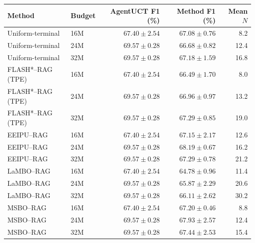 \begin{tabular}{@{}llrrr@{}}
\toprule
Method & Budget & AgentUCT F1 (\%) & Method F1 (\%) & Mean $N$\\
\midrule
Uniform-terminal & 16M & $67.40\pm2.54$ & $67.08\pm0.76$ & 8.2\\
Uniform-terminal & 24M & $69.57\pm0.28$ & $66.68\pm0.82$ & 12.4\\
Uniform-terminal & 32M & $69.57\pm0.28$ & $67.18\pm1.59$ & 16.8\\
FLASH*--RAG (TPE) & 16M & $67.40\pm2.54$ & $66.49\pm1.70$ & 8.0\\
FLASH*--RAG (TPE) & 24M & $69.57\pm0.28$ & $66.96\pm0.97$ & 13.2\\
FLASH*--RAG (TPE) & 32M & $69.57\pm0.28$ & $67.29\pm0.85$ & 19.0\\
EEIPU--RAG & 16M & $67.40\pm2.54$ & $67.15\pm2.17$ & 12.6\\
EEIPU--RAG & 24M & $69.57\pm0.28$ & $68.19\pm0.67$ & 16.2\\
EEIPU--RAG & 32M & $69.57\pm0.28$ & $67.29\pm0.78$ & 21.2\\
LaMBO--RAG & 16M & $67.40\pm2.54$ & $64.78\pm0.96$ & 11.4\\
LaMBO--RAG & 24M & $69.57\pm0.28$ & $65.87\pm2.29$ & 20.6\\
LaMBO--RAG & 32M & $69.57\pm0.28$ & $66.11\pm2.62$ & 30.2\\
MSBO--RAG & 16M & $67.40\pm2.54$ & $67.20\pm0.46$ & 8.8\\
MSBO--RAG & 24M & $69.57\pm0.28$ & $67.93\pm2.57$ & 12.4\\
MSBO--RAG & 32M & $69.57\pm0.28$ & $67.44\pm2.53$ & 15.4\\
\bottomrule
\end{tabular}
